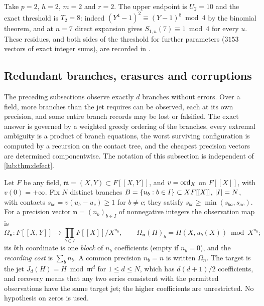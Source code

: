 \begin{example}\label{lub:ex:fleck}
\sloppy
Take $p=2$, $h=2$, $m=2$ and $r=2$. The upper endpoint is $U_2=10$ and the exact threshold
is $T_2=8$: indeed $(Y^4-1)^2\equiv(Y-1)^8\bmod4$ by the binomial theorem, and at $n=7$
direct expansion gives $S_{1,u}(7)\equiv1\bmod4$ for every $u$. These residues, and both
sides of the threshold for further parameters ($3153$ vectors of exact integer sums), are
recorded in .
\end{example}

\subsection{Redundant branches, erasures and corruptions}\label{lub:ssec:redundant}
\begingroup\raggedright{}\endgroup

The preceding subsections observe exactly $d$ branches without errors. Over a field, more
branches than the jet requires can be observed, each at its own precision, and some entire branch
records may be lost or falsified. The exact answer is governed by a weighted greedy ordering of the
branches, every extremal ambiguity is a product of branch equations, the worst surviving
configuration is computed by a recursion on the contact tree, and the cheapest precision vectors
are determined componentwise. The notation of this subsection is independent of
\cref{lub:thm:defect}.

Let $F$ be any field, $\mathfrak m=(X,Y)\subset F[[X,Y]]$, and $v=\operatorname{ord}_X$ on $F[[X]]$, with
$v(0)=+\infty$. Fix $N$ distinct branches $B=\{u_b:b\in I\}\subset XF[[X]]$, $\lvert I\rvert=N$,
with contacts $s_{bc}=v(u_b-u_c)\ge1$ for $b\ne c$; they satisfy
$s_{bc}\ge\min(s_{ba},s_{ac})$. For a precision vector $\mathbf n=(n_b)_{b\in I}$ of nonnegative
integers the observation map is
\[
 \Omega_{\mathbf n}\colon F[[X,Y]]\to\prod_{b\in I}F[[X]]/X^{n_b},\qquad
 \Omega_{\mathbf n}(H)_b=H(X,u_b(X))\bmod X^{n_b} ;
\]
its $b$th coordinate is one \emph{block} of $n_b$ coefficients (empty if $n_b=0$), and the
\emph{recording cost} is $\sum_bn_b$. A common precision $n_b=n$ is written $\Omega_n$. The target
is the jet $J_d(H)=H\bmod\mathfrak m^d$ for $1\le d\le N$, which has $d(d+1)/2$ coefficients, and
recovery means that any two series consistent with the permitted observations have the same
target jet; the higher coefficients are unrestricted. No hypothesis on zeros is used.

